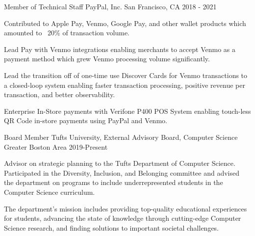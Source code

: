 
\begin{cventries}

  \cventry
    {Member of Technical Staff} %
    {PayPal, Inc.} %
    {San Francisco, CA} %
    {2018 - 2021} %
    {
      \begin{cvitems} %
        \item {Contributed to Apple Pay, Venmo, Google Pay, and other wallet products which amounted to ~20\% of transaction volume.}
        \item {Lead Pay with Venmo integrations enabling merchants to accept Venmo as a payment method which grew Venmo processing volume significantly.}
        \item {Lead the transition off of one-time use Discover Cards for Venmo transactions to a closed-loop system enabling faster transaction processing, positive revenue per transaction, and better observability.}
        \item {Enterprise In-Store payments with Verifone P400 POS System enabling touch-less QR Code in-store payments using PayPal and Venmo.}
      \end{cvitems}
    }

  \cventry
    {Board Member} %
    {Tufts University, External Advisory Board, Computer Science} %
    {Greater Boston Area} %
    {2019-Present} %
    {
      \begin{cvitems} %
      \item {Advisor on strategic planning to the Tufts Department of Computer Science. Participated in the Diversity, Inclusion, and Belonging committee and advised the department on programs to include underrepresented students in the Computer Science curriculum.}
      \item {The department's mission includes providing top-quality educational experiences for students, advancing the state of knowledge through cutting-edge Computer Science research, and finding solutions to important societal challenges.}
      \end{cvitems}
    }


\end{cventries}
